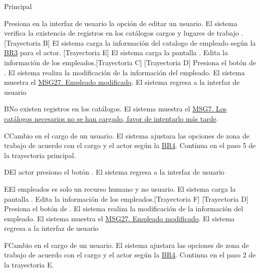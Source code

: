 \begin{UCtrayectoria}{Principal}
    
    \UCpaso[\UCactor] Presiona en la interfaz de usuario  la opción de editar un usuario. 
    \UCpaso  El sistema verifica la existencia de registros en los catálogos cargos  y  lugares de trabajo . [Trayectoria B] 
    \UCpaso El sistema carga la información del catalogo de empleado  según la \hyperlink{reglas-BR3}{BR3} para el actor. [Trayectoria E]
    \UCpaso El sistema carga la pantalla  .
    \UCpaso[\UCactor] Edita la información de los empleados.[Trayectoria C] [Trayectoria D] 
    \UCpaso[\UCactor]  Presiona el botón de .
    \UCpaso El sistema realiza la modificación de la información del empleado.
    \UCpaso  El sistema muestra el \hyperref[MSG27]{MSG27. Empleado modificado}.    
    \UCpaso El sistema regresa a la interfaz de usuario 
\end{UCtrayectoria}

\begin{UCtrayectoriaA}{B}{No existen registros en los catálogos.}
    \UCpaso     El sistema muestra el \hyperref[MSG7]{MSG7. Los catálogos necesarios no se han cargado, favor de intentarlo más tarde}.
\end{UCtrayectoriaA}

\begin{UCtrayectoriaA}{C}{Cambio en el cargo de un usuario.}
    \UCpaso     El sistema ajustara las opciones de zona de trabajo de acuerdo con el cargo y el actor según la \hyperlink{reglas-BR4}{BR4}.
    \UCpaso     Continua en el paso 5 de la trayectoria principal.
\end{UCtrayectoriaA}

\begin{UCtrayectoriaA}{D}{El actor presiono el botón .}
 \UCpaso El sistema regresa a la interfaz de usuario 
\end{UCtrayectoriaA}
\begin{UCtrayectoriaA}{E}{El empleados es solo un recurso humano y no usuario.}
 \UCpaso El sistema carga la pantalla  .
    \UCpaso[\UCactor] Edita la información de los empleados.[Trayectoria F] [Trayectoria D] 
    \UCpaso[\UCactor]  Presiona el botón de .
    \UCpaso El sistema realiza la modificación de la información del empleado.
    \UCpaso  El sistema muestra el \hyperref[MSG27]{MSG27. Empleado modificado}.    
    \UCpaso El sistema regresa a la interfaz de usuario 
\end{UCtrayectoriaA}
\begin{UCtrayectoriaA}{F}{Cambio en el cargo de un usuario.}
    \UCpaso     El sistema ajustara las opciones de zona de trabajo de acuerdo con el cargo y el actor según la \hyperlink{reglas-BR4}{BR4}.
    \UCpaso     Continua en el paso 2 de la trayectoria E.
\end{UCtrayectoriaA}